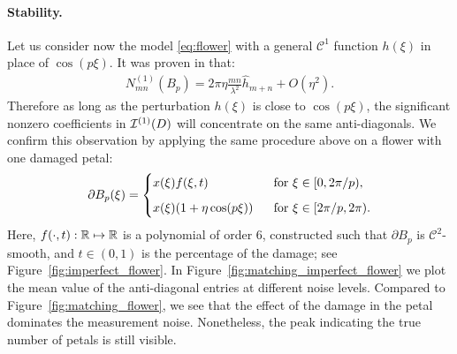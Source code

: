 \paragraph{Stability.}
Let us consider now the model \eqref{eq:flower} with a general
$\mathcal{C}^1$ function $h(\xi)$ in place of $\cos(p\xi)$. It was
proven in \cite{AGKLY11} that:
\begin{align}
  N_{mn}^{(1)}(B_p) = 2\pi\eta\frac{mn}{\lambda^2}\hat
  h_{m+n} + O(\eta^2).
  \label{eq:flower_CGPT_Fourier}
\end{align}
Therefore as long as the perturbation $h(\xi)$ is close to
$\cos(p\xi)$, the significant nonzero coefficients in $\mathcal{I}^{(1)}(D)$
will concentrate on the same anti-diagonals. We confirm this
observation by applying the same procedure above on a flower with
one damaged petal:
\begin{align}
  \label{eq:damaged_flower}
  \partial B_p(\xi) =
  \begin{cases}
    x(\xi)f(\xi, t) \ &\mbox{ for } \xi\in[0,2\pi/p),\\
    \nm
    x(\xi)(1+\eta \cos(p\xi)) \ &\mbox{ for } \xi\in[2\pi/p,
    2\pi).
  \end{cases}
\end{align}
Here, $f(\cdot, t):\R\mapsto\R$ is a polynomial of order 6,
constructed such that $\partial B_p$ is $\mathcal{C}^2$-smooth,
and $t \in (0,1)$ is the percentage of the damage; see
Figure~\ref{fig:imperfect_flower}. In
Figure~\ref{fig:matching_imperfect_flower} we plot the mean value
of the anti-diagonal entries at different noise levels. Compared
to Figure~\ref{fig:matching_flower}, we see that the effect of the
damage in the petal dominates the measurement noise. Nonetheless,
the peak indicating the true number of petals is still visible.

